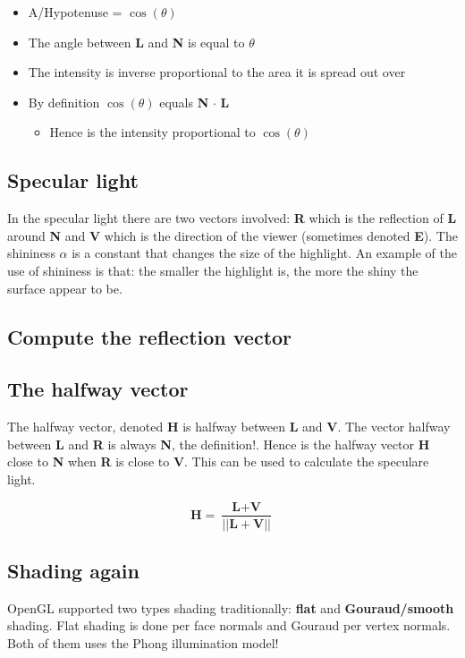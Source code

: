 	\begin{itemize}
		\item A/Hypotenuse = $\cos(\theta)$
		\item The angle between \textbf{L} and \textbf{N} is equal to $\theta$
		\item The intensity is inverse proportional to the area it is spread out over
		\item By definition $\cos(\theta)$ equals \textbf{N} $\cdot$ \textbf{L} 
		\begin{itemize}
		 	\item Hence is the intensity proportional to $\cos(\theta)$
		 \end{itemize} 
	\end{itemize}
	
	\subsection*{Specular light}
	In the specular light there are two vectors involved: \textbf{R} which is the reflection of \textbf{L} around \textbf{N} and \textbf{V} which is the direction of the viewer (sometimes denoted \textbf{E}). The shininess $\alpha$ is a constant that changes the size of the highlight. An example of the use of shininess is that: the smaller the highlight is, the more the shiny the surface appear to be.

	\subsection*{Compute the reflection vector}
	



	\subsection*{The halfway vector}
	The halfway vector, denoted \textbf{H} is halfway between \textbf{L} and \textbf{V}. The vector halfway between \textbf{L} and \textbf{R} is always \textbf{N}, the definition!. Hence is the halfway vector \textbf{H} close to \textbf{N} when \textbf{R} is close to \textbf{V}. This can be used to calculate the speculare light. 

		\begin{equation}
			\textbf{H} = \frac{\textbf{L} + \textbf{V}} {||\textbf{L} + \textbf{V}||} 		
		\end{equation}
		
	\subsection*{Shading again}
	OpenGL supported two types shading traditionally: \textbf{flat} and \textbf{Gouraud/smooth} shading. Flat shading is done per face normals and Gouraud per vertex normals. Both of them uses the Phong illumination model!

